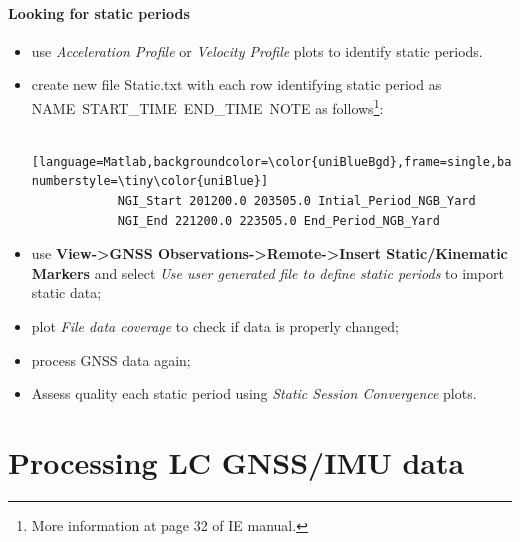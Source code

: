 \documentclass[11pt,fleqn]{book} %
\begin{document}
\subsubsection{Looking for static periods\label{sec:Static-periods}}

\begin{itemize}
	\item use \emph{Acceleration Profile} or \emph{Velocity Profile} plots to identify static periods.
	\item create new file Static.txt with each row identifying static period as NAME~START\_TIME~END\_TIME~NOTE as follows\footnote{More information at page 32 of IE manual.}:

		\begin{lstlisting} [language=Matlab,backgroundcolor=\color{uniBlueBgd},frame=single,basicstyle=\footnotesize,numbers=left,numbersep=5pt, numberstyle=\tiny\color{uniBlue}]
			NGI_Start 201200.0 203505.0 Intial_Period_NGB_Yard
			NGI_End 221200.0 223505.0 End_Period_NGB_Yard
		\end{lstlisting}

	\item use \textbf{View->GNSS Observations->Remote->Insert Static/Kinematic Markers} and select \textit{Use user generated file to define static periods} to import static data;
	\item plot \textit{File data coverage} to check if data is properly changed;
	\item process GNSS data again;
	\item Assess quality each static period using \emph{Static Session Convergence} plots. 
\end{itemize}

\vspace{2cm}


\chapter{Processing LC GNSS/IMU data\label{sec:Processing-Loosely-Coupled}}
\end{document}
